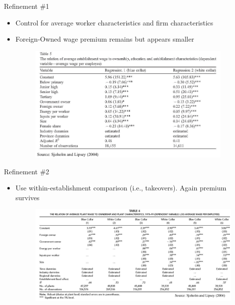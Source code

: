 \documentclass[10pt,hyperref={CJKbookmarks=true},xcolor=dvipsnames,aspectratio=169]{beamer}
\begin{document}
\begin{frame}{Refinement \#1}

\begin{itemize}
\item Control for average worker characteristics and firm characteristics 
\item Foreign-Owned wage premium remains but appears smaller
\begin{figure}


\begin{centering}
\includegraphics[width=10cm]{fig/fdi/lec7-13}
\par\end{centering}

\end{figure}

\end{itemize}
\end{frame}

\begin{frame}{Refinement \#2}

\begin{itemize}
\item Use within-establishment comparison (i.e., takeovers). Again premium
survives 
\begin{figure}


\begin{centering}
\includegraphics[width=11cm]{fig/fdi/lec7-14}
\par\end{centering}

\end{figure}

\end{itemize}
\end{frame}
\end{document}
